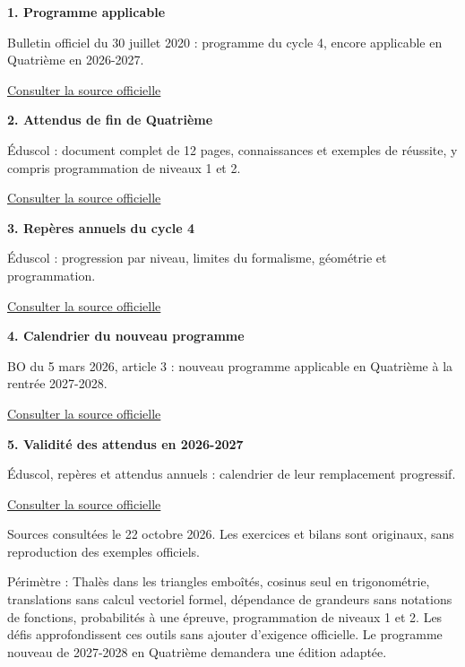 \clearpage\thispagestyle{otFront}\label{references}\fontsize{11}{15}\selectfont
\par\medskip\textbf{1. Programme applicable}\par Bulletin officiel du 30 juillet 2020 : programme du cycle 4, encore applicable en Quatrième en 2026-2027.\par\href{https://www.education.gouv.fr/bo/20/Hebdo31/MENE2018714A.htm}{\textcolor{otGreenDark}{Consulter la source officielle}}\par
\par\medskip\textbf{2. Attendus de fin de Quatrième}\par Éduscol : document complet de 12 pages, connaissances et exemples de réussite, y compris programmation de niveaux 1 et 2.\par\href{https://eduscol.education.gouv.fr/sites/default/files/document/16-maths-4e-attendus-eduscol1114746pdf-74682.pdf}{\textcolor{otGreenDark}{Consulter la source officielle}}\par
\par\medskip\textbf{3. Repères annuels du cycle 4}\par Éduscol : progression par niveau, limites du formalisme, géométrie et programmation.\par\href{https://eduscol.education.gouv.fr/sites/default/files/document/26-maths-c4-reperes-eduscol1114756pdf-74694.pdf}{\textcolor{otGreenDark}{Consulter la source officielle}}\par
\par\medskip\textbf{4. Calendrier du nouveau programme}\par BO du 5 mars 2026, article 3 : nouveau programme applicable en Quatrième à la rentrée 2027-2028.\par\href{https://www.education.gouv.fr/bo/2026/Hebdo10/MENE2602912A}{\textcolor{otGreenDark}{Consulter la source officielle}}\par
\par\medskip\textbf{5. Validité des attendus en 2026-2027}\par Éduscol, repères et attendus annuels : calendrier de leur remplacement progressif.\par\href{https://eduscol.education.gouv.fr/6910/reperes-annuels-de-progression-et-attendus-de-fin-d-annee-du-cp-la-troisieme}{\textcolor{otGreenDark}{Consulter la source officielle}}\par
\par\bigskip Sources consultées le 22 octobre 2026. Les exercices et bilans
sont originaux, sans reproduction des exemples officiels.\par\medskip
Périmètre : Thalès dans les triangles emboîtés, cosinus seul en trigonométrie,
translations sans calcul vectoriel formel, dépendance de grandeurs sans
notations de fonctions, probabilités à une épreuve, programmation de niveaux
1 et 2. Les défis approfondissent ces outils sans ajouter d’exigence officielle.
Le programme nouveau de 2027-2028 en Quatrième demandera une édition adaptée.

\clearpage
